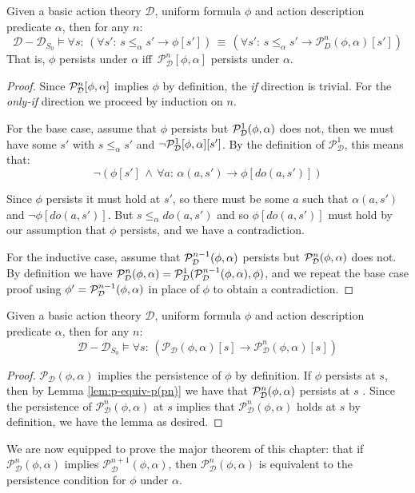 \begin{lemma}
Given a basic action theory $\mathcal{D}$, uniform formula $\phi$
and action description predicate $\alpha$, then for any $n$:\label{lem:p-equiv-p(pn)}\[
\mathcal{D}-\mathcal{D}_{S_{0}}\models\forall s:\,\left(\forall s':\, s\leq_{\alpha}s'\rightarrow\phi[s']\right)\,\equiv\,\left(\forall s':\, s\leq_{\alpha}s'\rightarrow\mathcal{P}_{D}^{n}(\phi,\alpha)[s']\right)\]
 That is, $\phi$ persists under $\alpha$ iff $\,\mathcal{P}_{\mathcal{D}}^{n}[\phi,\alpha]$
persists under $\alpha$. 
\end{lemma}
\begin{proof}
Since $\mathcal{P}_{\mathcal{D}}^{n}[\phi,\alpha]$ implies $\phi$ by definition,
the \emph{if} direction is trivial. For the \emph{only-if} direction
we proceed by induction on $n$.

For the base case, assume that $\phi$ persists but $\mathcal{P}_{\mathcal{D}}^{1}(\phi,\alpha)$
does not, then we must have some $s'$ with $s\leq_{\alpha}s'$ and
$\neg\mathcal{P}_{\mathcal{D}}^{1}[\phi,\alpha][s']$. By the definition of $\mathcal{P}_{\mathcal{D}}^{1}$,
this means that:\[
\neg\left(\phi[s']\,\wedge\,\forall a:\,\alpha(a,s')\rightarrow\phi[do(a,s')]\right)\]


Since $\phi$ persists it must hold at $s'$, so there must be some
$a$ such that $\alpha(a,s')$ and $\neg\phi[do(a,s')]$. But $s\leq_{\alpha}do(a,s')$
and so $\phi[do(a,s')]$ must hold by our assumption that $\phi$
persists, and we have a contradiction.

For the inductive case, assume that $\mathcal{P}_{\mathcal{D}}^{n-1}(\phi,\alpha)$
persists but $\mathcal{P}_{\mathcal{D}}^{n}(\phi,\alpha)$ does not. By definition
we have $\mathcal{P}_{\mathcal{D}}^{n}(\phi,\alpha)=\mathcal{P}_{\mathcal{D}}^{1}(\mathcal{P}_{\mathcal{D}}^{n-1}(\phi,\alpha),\phi)$,
and we repeat the base case proof using $\phi'=\mathcal{P}_{\mathcal{D}}^{n-1}(\phi,\alpha)$
in place of $\phi$ to obtain a contradiction. 
\end{proof}
\begin{lemma}
Given a basic action theory $\mathcal{D}$, uniform formula $\phi$
and action description predicate $\alpha$, then for any $n$:\label{lem:p-implies-pn}\[
\mathcal{D}-\mathcal{D}_{S_{0}}\models\forall s:\,\left(\mathcal{P_{D}}(\phi,\alpha)[s]\rightarrow\mathcal{P}_{\mathcal{D}}^{n}(\phi,\alpha)[s]\right)\]

\end{lemma}
\begin{proof}
$\mathcal{P_{D}}(\phi,\alpha)$ implies the persistence of $\phi$
by definition. If $\phi$ persists at $s$, then by Lemma \ref{lem:p-equiv-p(pn)}
we have that $\mathcal{P}_{\mathcal{D}}^{n}(\phi,\alpha)$ persists at $s$ . Since
the persistence of $\mathcal{P}_{\mathcal{D}}^{n}(\phi,\alpha)$ at
$s$ implies that $\mathcal{P}_{\mathcal{D}}^{n}(\phi,\alpha)$ holds
at $s$ by definition, we have the lemma as desired. 
\end{proof}
We are now equipped to prove the major theorem of this chapter: that
if $\mathcal{P}_{\mathcal{D}}^{n}(\phi,\alpha)$ implies $\mathcal{P}_{\mathcal{D}}^{n+1}(\phi,\alpha)$,
then $\mathcal{P}_{\mathcal{D}}^{n}(\phi,\alpha)$ is equivalent to
the persistence condition for $\phi$ under $\alpha$.\newpage{}

